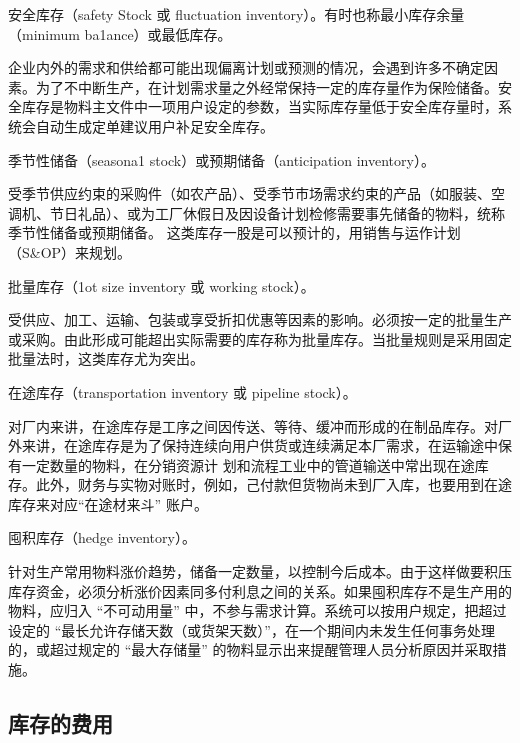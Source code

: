     \begin{enumerate.zh}
        \item 安全库存（safety Stock 或 ﬂuctuation inventory）。有时也称最小库存余量（minimum ba1ance）或最低库存。

        企业内外的需求和供给都可能出现偏离计划或预测的情况，会遇到许多不确定因素。为了不中断生产，在计划需求量之外经常保持一定的库存量作为保险储备。安全库存是物料主文件中一项用户设定的参数，当实际库存量低于安全库存量时，系统会自动生成定单建议用户补足安全库存。

        \item 季节性储备（seasona1 stock）或预期储备（anticipation inventory）。

         受季节供应约束的采购件（如农产品）、受季节市场需求约束的产品（如服装、空调机、节日礼品）、或为工厂休假日及因设备计划检修需要事先储备的物料，统称季节性储备或预期储备。 这类库存一股是可以预计的，用销售与运作计划（S\&OP）来规划。

        \item 批量库存（1ot size inventory 或 working stock）。

        受供应、加工、运输、包装或享受折扣优惠等因素的影响。必须按一定的批量生产或采购。由此形成可能超出实际需要的库存称为批量库存。当批量规则是采用固定批量法时，这类库存尤为突出。

        \item 在途库存（transportation inventory 或 pipeline stock）。

        对厂内来讲，在途库存是工序之间因传送、等待、缓冲而形成的在制品库存。对厂外来讲，在途库存是为了保持连续向用户供货或连续满足本厂需求，在运输途中保有一定数量的物料，在分销资源计
    划和流程工业中的管道输送中常出现在途库存。此外，财务与实物对账时，例如，己付款但货物尚未到厂入库，也要用到在途库存来对应“在途材来斗” 账户。

        \item 囤积库存（hedge inventory）。

        针对生产常用物料涨价趋势，储备一定数量，以控制今后成本。由于这样做要积压库存资金，必须分析涨价因素同多付利息之间的关系。如果囤积库存不是生产用的物料，应归入 “不可动用量” 中，不参与需求计算。系统可以按用户规定，把超过设定的 “最长允许存储天数（或货架天数）”，在一个期间内未发生任何事务处理的，或超过规定的 “最大存储量” 的物料显示出来提醒管理人员分析原因并采取措施。

    \end{enumerate.zh}

\subsection {库存的费用}

